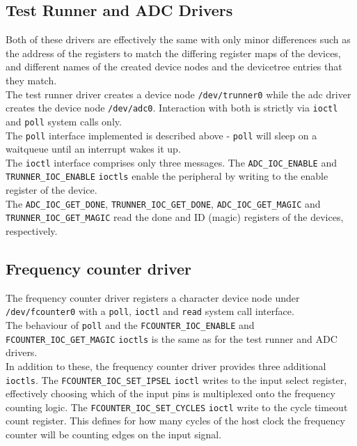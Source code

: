 \subsection{Test Runner and ADC Drivers}
Both of these drivers are effectively the same with only minor differences such as the
address of the registers to match the differing register maps of the devices, and different
names of the created device nodes and the devicetree entries that they match.
\\

The test runner driver creates a device node \texttt{/dev/trunner0} while the adc
driver creates the device node \texttt{/dev/adc0}. Interaction with both is strictly
via \texttt{ioctl} and \texttt{poll} system calls only.
\\

The \texttt{poll} interface implemented is described above - \texttt{poll} will
sleep on a waitqueue until an interrupt wakes it up.
\\

The \texttt{ioctl} interface comprises only three messages. The \texttt{ADC\_IOC\_ENABLE} and
\texttt{TRUNNER\_IOC\_ENABLE} \texttt{ioctls} enable the peripheral by writing to the
enable register of the device.
\\

The \texttt{ADC\_IOC\_GET\_DONE}, \texttt{TRUNNER\_IOC\_GET\_DONE},
\texttt{ADC\_IOC\_GET\_MAGIC} and 
\\
\texttt{TRUNNER\_IOC\_GET\_MAGIC} read the done and
ID (magic) registers of the devices, respectively.



\subsection{Frequency counter driver}
The frequency counter driver registers a character device node under
\\
\texttt{/dev/fcounter0}
with a \texttt{poll}, \texttt{ioctl} and \texttt{read} system call interface.
\\

The behaviour of \texttt{poll} and the \texttt{FCOUNTER\_IOC\_ENABLE} and
\\
\texttt{FCOUNTER\_IOC\_GET\_MAGIC}
\texttt{ioctls} is the same as for the test runner and ADC drivers.
\\

In addition to these, the frequency counter driver provides three additional \texttt{ioctls}.
The \texttt{FCOUNTER\_IOC\_SET\_IPSEL} \texttt{ioctl} writes to the input select register,
effectively choosing which of the input pins is multiplexed onto the frequency counting logic.
The \texttt{FCOUNTER\_IOC\_SET\_CYCLES} \texttt{ioctl} write to the cycle timeout count register. This
defines for how many cycles of the host clock the frequency counter will be counting edges on the
input signal.
\\

